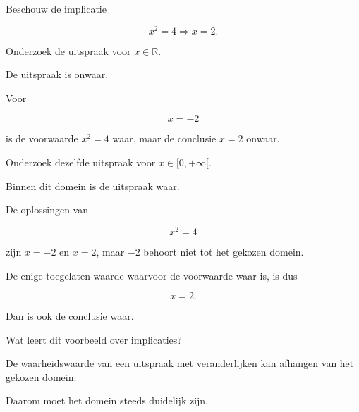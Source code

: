 \documentclass{ximera}
\begin{document}
\begin{oefening}{\oefU\ESS}

Beschouw de implicatie

\[
x^2=4\Rightarrow x=2.
\]

\begin{question}

Onderzoek de uitspraak voor $x\in\mathbb{R}$.

\begin{oplossing}

De uitspraak is onwaar.

Voor

\[
x=-2
\]

is de voorwaarde $x^2=4$ waar, maar de conclusie $x=2$ onwaar.

\end{oplossing}

\end{question}


\begin{question}

Onderzoek dezelfde uitspraak voor $x\in[0,+\infty[$.

\begin{oplossing}

Binnen dit domein is de uitspraak waar.

De oplossingen van

\[
x^2=4
\]

zijn $x=-2$ en $x=2$, maar $-2$ behoort niet tot het gekozen domein.

De enige toegelaten waarde waarvoor de voorwaarde waar is, is dus

\[
x=2.
\]

Dan is ook de conclusie waar.

\end{oplossing}

\end{question}


\begin{question}

Wat leert dit voorbeeld over implicaties?

\begin{oplossing}

De waarheidswaarde van een uitspraak met veranderlijken kan afhangen
van het gekozen domein.

Daarom moet het domein steeds duidelijk zijn.

\end{oplossing}

\end{question}

\end{oefening}
\end{document}
